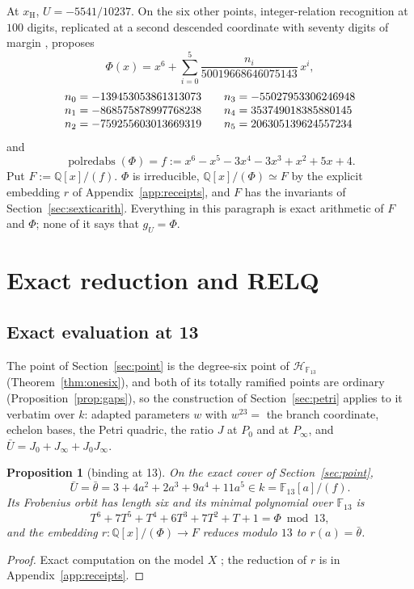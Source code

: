 \documentclass[11pt]{amsart}
\newcommand{\QQ}{\mathbb{Q}}
\newcommand{\FF}{\mathbb{F}}
\newcommand{\Hs}{\mathscr H}
\newcommand{\xH}{x_{\mathrm H}}
\newcommand{\gU}{g_U}
\newcommand{\sextic}{x^6-x^5-3x^4-3x^3+x^2+5x+4}
\theoremstyle{plain}
\newtheorem{proposition}[theorem]{Proposition}
\theoremstyle{definition}
\begin{document}
At $\xH$, $U=-5541/10237$. On the six other points, integer-relation
recognition at $100$ digits, replicated at a second descended
coordinate with seventy digits of margin \cite{seven}, proposes
\[
  \Phi(x)=x^6+\sum_{i=0}^{5}\frac{n_i}{50019668646075143}\,x^i,
\]
\[
\begin{array}{r@{\;=\;}l@{\qquad}r@{\;=\;}l}
n_0 & -139453053861313073 & n_3 & -55027953306246948\\
n_1 & -868575878997768238 & n_4 & 353749018385880145\\
n_2 & -759255603013669319 & n_5 & 206305139624557234
\end{array}
\]
and
\[
  \operatorname{polredabs}(\Phi)=f:=\sextic .
\]
Put $F:=\QQ[x]/(f)$. $\Phi$ is irreducible, $\QQ[x]/(\Phi)\simeq F$ by
the explicit embedding $r$ of Appendix~\ref{app:receipts}, and $F$ has
the invariants of Section~\ref{sec:sexticarith}. Everything in this
paragraph is exact arithmetic of $F$ and $\Phi$; none of it says that
$\gU=\Phi$.

\section{Exact reduction and RELQ}\label{sec:relq}

\subsection{Exact evaluation at 13}

The point of Section~\ref{sec:point} is the degree-six point of
$\Hs_{\FF_{13}}$ (Theorem~\ref{thm:onesix}), and both of its totally
ramified points are ordinary (Proposition~\ref{prop:gaps}), so the
construction of Section~\ref{sec:petri} applies to it verbatim over
$k$: adapted parameters $w$ with $w^{23}=$ the branch coordinate,
echelon bases, the Petri quadric, the ratio $J$ at $P_0$ and at
$P_\infty$, and $\bar U=J_0+J_\infty+J_0J_\infty$.

\begin{proposition}[binding at 13]\label{prop:bind}
On the exact cover of Section~\ref{sec:point},
\[
  \bar U=\bar\theta=3+4a^2+2a^3+9a^4+11a^5\in k=\FF_{13}[a]/(f) .
\]
Its Frobenius orbit has length six and its minimal polynomial over
$\FF_{13}$ is
\[
  T^6+7T^5+T^4+6T^3+7T^2+T+1=\Phi\bmod13 ,
\]
and the embedding $r\colon\QQ[x]/(\Phi)\to F$ reduces modulo $13$ to
$r(a)=\bar\theta$.
\end{proposition}
\begin{proof}
Exact computation on the model $X$ \cite[petri-f13]{receipts}; the
reduction of $r$ is in Appendix~\ref{app:receipts}.
\end{proof}
\end{document}

